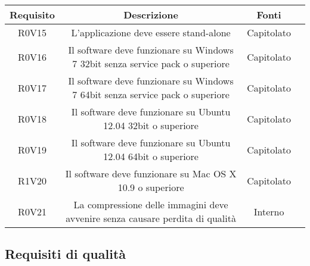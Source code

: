 \begin{center}
\begin{longtable}{|c|c|c|c|}
\hline

\textbf{Requisito} & \textbf{Descrizione} & \textbf{Fonti} \\
\hline
R0V15  & \parbox[t]{\larghezza}{L'applicazione deve essere stand-alone}  & \parbox[t]{\dimFonti}{ Capitolato \\} \\
\hline
R0V16  & \parbox[t]{\larghezza}{Il software deve funzionare su Windows\glossario{} 7 32bit senza service pack o superiore }  & \parbox[t]{\dimFonti}{ Capitolato \\} \\
\hline
R0V17  & \parbox[t]{\larghezza}{Il software deve funzionare su Windows\glossario{} 7 64bit senza service pack o superiore}  & \parbox[t]{\dimFonti}{ Capitolato \\} \\
\hline
R0V18  & \parbox[t]{\larghezza}{Il software deve funzionare su Ubuntu 12.04 32bit o superiore}  & \parbox[t]{\dimFonti}{ Capitolato \\} \\
\hline
R0V19  & \parbox[t]{\larghezza}{Il software deve funzionare su Ubuntu 12.04 64bit o superiore}  & \parbox[t]{\dimFonti}{ Capitolato \\} \\
\hline
R1V20  & \parbox[t]{\larghezza}{Il software deve funzionare su Mac OS\glossario{} X 10.9 o superiore}  & \parbox[t]{\dimFonti}{ Capitolato \\} \\
\hline
R0V21  & \parbox[t]{\larghezza}{La compressione delle immagini deve avvenire senza causare perdita di qualità}  & \parbox[t]{\dimFonti}{ Interno \\} \\
\hline
\end{longtable}
\end{center}
\subsection{Requisiti di qualità}
\label{requisitidiqualità}

